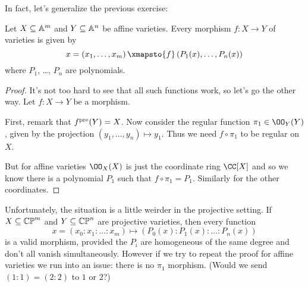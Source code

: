 \documentclass[11pt]{scrreprt}
\begin{document}
In fact, let's generalize the previous exercise:
\begin{theorem}
	Let $X \subseteq \mathbb A^m$ and $Y \subseteq \mathbb A^n$ be affine varieties.
	Every morphism $f : X \to Y$ of varieties is given by
	\[
		x = \left( x_1, \dots, x_m \right)
		\xmapsto{f} \left( P_1(x), \dots, P_n(x) \right)
	\]
	where $P_1$, \dots, $P_n$ are polynomials.
	\label{thm:affine_global_polynomial}
\end{theorem}
\begin{proof}
	It's not too hard to see that all such functions work,
	so let's go the other way.
	Let $f : X \to Y$ be a morphism.

	First, remark that $f^{\text{pre}}(Y) = X$.
	Now consider the regular function $\pi_1 \in \OO_Y(Y)$,
	given by the projection $(y_1, \dots, y_n) \mapsto y_1$.
	Thus we need $f \circ \pi_1$ to be regular on $X$.

	But for affine varieties $\OO_X(X)$ is just the coordinate ring $\CC[X]$
	and so we know there is a polynomial $P_1$ such that $f \circ \pi_1 = P_1$.
	Similarly for the other coordinates.
\end{proof}
Unfortunately, the situation is a little weirder in the projective setting.
If $X \subseteq \mathbb{CP}^m$ and $Y \subseteq \mathbb{CP}^n$ are projective varieties,
then every function
\[
	x = \left( x_0 : x_1 : \dots : x_m \right)
	\mapsto \left( P_0(x) : P_1(x) : \dots : P_n(x) \right)
\]
is a valid morphism, provided the $P_i$ are homogeneous
of the same degree and don't all vanish simultaneously.
However if we try to repeat the proof for affine varieties
we run into an issue: there is no $\pi_1$ morphism.
(Would we send $(1:1) = (2:2)$ to $1$ or $2$?)
\end{document}
